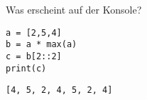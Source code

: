 \question[3]
Was erscheint auf der Konsole?
\begin{lstlisting}
a = [2,5,4]
b = a * max(a)
c = b[2::2]
print(c)
\end{lstlisting}
\begin{solutionbox}{1cm}
\texttt{[4, 5, 2, 4, 5, 2, 4]}
\end{solutionbox}
